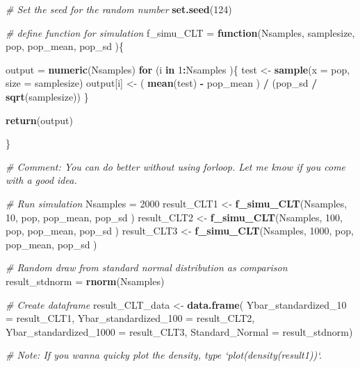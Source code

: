 \documentclass[]{book}
\newenvironment{Shaded}{\begin{snugshade}}{\end{snugshade}}
\newcommand{\CommentTok}[1]{\textcolor[rgb]{0.56,0.35,0.01}{\textit{#1}}}
\newcommand{\ControlFlowTok}[1]{\textcolor[rgb]{0.13,0.29,0.53}{\textbf{#1}}}
\newcommand{\DataTypeTok}[1]{\textcolor[rgb]{0.13,0.29,0.53}{#1}}
\newcommand{\DecValTok}[1]{\textcolor[rgb]{0.00,0.00,0.81}{#1}}
\newcommand{\KeywordTok}[1]{\textcolor[rgb]{0.13,0.29,0.53}{\textbf{#1}}}
\newcommand{\NormalTok}[1]{#1}
\newcommand{\OperatorTok}[1]{\textcolor[rgb]{0.81,0.36,0.00}{\textbf{#1}}}
\newcommand{\StringTok}[1]{\textcolor[rgb]{0.31,0.60,0.02}{#1}}
\begin{document}
\begin{Shaded}
\begin{Highlighting}[]
\CommentTok{# Set the seed for the random number}
\KeywordTok{set.seed}\NormalTok{(}\DecValTok{124}\NormalTok{)}

\CommentTok{# define function for simulation }
\NormalTok{f_simu_CLT =}\StringTok{ }\ControlFlowTok{function}\NormalTok{(Nsamples, samplesize, pop, pop_mean, pop_sd )\{}
  
\NormalTok{  output =}\StringTok{ }\KeywordTok{numeric}\NormalTok{(Nsamples)}
  \ControlFlowTok{for}\NormalTok{ (i }\ControlFlowTok{in} \DecValTok{1}\OperatorTok{:}\NormalTok{Nsamples )\{}
\NormalTok{    test <-}\StringTok{ }\KeywordTok{sample}\NormalTok{(}\DataTypeTok{x =}\NormalTok{ pop, }\DataTypeTok{size =}\NormalTok{ samplesize)}
\NormalTok{    output[i] <-}\StringTok{ }\NormalTok{( }\KeywordTok{mean}\NormalTok{(test) }\OperatorTok{-}\StringTok{ }\NormalTok{pop_mean ) }\OperatorTok{/}\StringTok{ }\NormalTok{(pop_sd }\OperatorTok{/}\StringTok{ }\KeywordTok{sqrt}\NormalTok{(samplesize))}
\NormalTok{  \}}
  
  \KeywordTok{return}\NormalTok{(output)}

\NormalTok{\}}

\CommentTok{# Comment: You can do better without using forloop. Let me know if you come with a good idea.}

\CommentTok{# Run simulation }
\NormalTok{Nsamples =}\StringTok{ }\DecValTok{2000}
\NormalTok{result_CLT1 <-}\StringTok{ }\KeywordTok{f_simu_CLT}\NormalTok{(Nsamples, }\DecValTok{10}\NormalTok{, pop, pop_mean, pop_sd )}
\NormalTok{result_CLT2 <-}\StringTok{ }\KeywordTok{f_simu_CLT}\NormalTok{(Nsamples, }\DecValTok{100}\NormalTok{, pop, pop_mean, pop_sd )}
\NormalTok{result_CLT3 <-}\StringTok{ }\KeywordTok{f_simu_CLT}\NormalTok{(Nsamples, }\DecValTok{1000}\NormalTok{, pop, pop_mean, pop_sd )}

\CommentTok{# Random draw from standard normal distribution as comparison}
\NormalTok{result_stdnorm =}\StringTok{ }\KeywordTok{rnorm}\NormalTok{(Nsamples)}

\CommentTok{# Create dataframe}
\NormalTok{result_CLT_data <-}\StringTok{ }\KeywordTok{data.frame}\NormalTok{(  }\DataTypeTok{Ybar_standardized_10 =}\NormalTok{ result_CLT1, }
                            \DataTypeTok{Ybar_standardized_100 =}\NormalTok{ result_CLT2, }
                            \DataTypeTok{Ybar_standardized_1000 =}\NormalTok{ result_CLT3, }
                            \DataTypeTok{Standard_Normal =}\NormalTok{ result_stdnorm)}

\CommentTok{# Note: If you wanna quicky plot the density, type `plot(density(result1))`. }
\end{Highlighting}
\end{Shaded}
\end{document}
